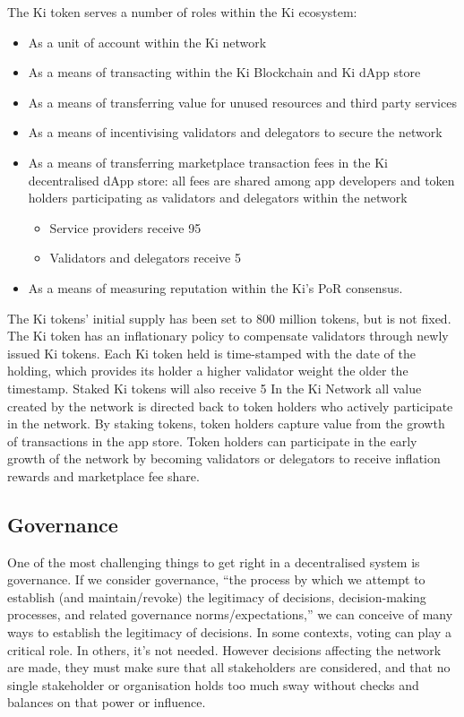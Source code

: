The Ki token serves a number of roles within the Ki ecosystem:
\begin{itemize}
	\item As a unit of account within the Ki network
	\item As a means of transacting within the Ki Blockchain and Ki dApp store 
	\item As a means of transferring value for unused resources and third party services
	\item As a means of incentivising validators and delegators to secure the network
	\item As a means of transferring marketplace transaction fees in the Ki decentralised dApp store: all fees are shared among app developers and token holders participating as validators and delegators within the network
	\begin{itemize}
		\item Service providers receive 95%
		\item Validators and delegators receive 5%
	\end{itemize}
	\item As a means of measuring reputation within the Ki’s PoR consensus.
\end{itemize}


The Ki tokens’ initial supply has been set to 800 million tokens, but is not fixed. The Ki token has an inflationary policy to compensate validators through newly issued Ki tokens. Each Ki token held is time-stamped with the date of the holding, which provides its holder a higher validator weight the older the timestamp. Staked Ki tokens will also receive 5%
In the Ki Network all value created by the network is directed back to token holders who actively participate in the network. By staking tokens, token holders capture value from the growth of transactions in the app store.
Token holders can participate in the early growth of the network by becoming validators or delegators to receive inflation rewards and marketplace fee share.

\subsection{Governance}

One of the most challenging things to get right in a decentralised system is governance. If we consider governance, “the process by which we attempt to establish (and maintain/revoke) the legitimacy of decisions, decision-making processes, and related governance norms/expectations,” we can conceive of many ways to establish the legitimacy of decisions. In some contexts, voting can play a critical role. In others, it’s not needed. However decisions affecting the network are made, they must make sure that all stakeholders are considered, and that no single stakeholder or organisation holds too much sway without checks and balances on that power or influence. 

